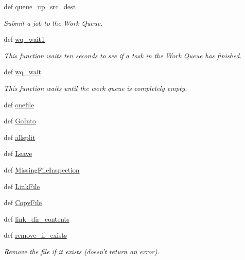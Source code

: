 \begin{DoxyCompactItemize}
def \hyperlink{namespaceforcebalance_1_1nifty_a5d5abeb4a185fde64721d044831e18ee}{queue\-\_\-up\-\_\-src\-\_\-dest}
\begin{DoxyCompactList}\small\item\em \-Submit a job to the \-Work \-Queue. \end{DoxyCompactList}\item 
def \hyperlink{namespaceforcebalance_1_1nifty_a374aac2ef003be02fab49b20ff0a82f0}{wq\-\_\-wait1}
\begin{DoxyCompactList}\small\item\em \-This function waits ten seconds to see if a task in the \-Work \-Queue has finished. \end{DoxyCompactList}\item 
def \hyperlink{namespaceforcebalance_1_1nifty_a576de8c5b6f236280e07e73e39b2ab7c}{wq\-\_\-wait}
\begin{DoxyCompactList}\small\item\em \-This function waits until the work queue is completely empty. \end{DoxyCompactList}\item 
def \hyperlink{namespaceforcebalance_1_1nifty_ab5417ad84c6c760965cd195c6c387914}{onefile}
\item 
def \hyperlink{namespaceforcebalance_1_1nifty_ad432b88307e1178b0690c0d350b1af36}{\-Go\-Into}
\item 
def \hyperlink{namespaceforcebalance_1_1nifty_ac9ab6c5543a2e3080061e0024850edf3}{allsplit}
\item 
def \hyperlink{namespaceforcebalance_1_1nifty_ab04e8690d099db2379dc860e0d040120}{\-Leave}
\item 
def \hyperlink{namespaceforcebalance_1_1nifty_ae87c7def5f8edf2ec30737bdb1d2636f}{\-Missing\-File\-Inspection}
\item 
def \hyperlink{namespaceforcebalance_1_1nifty_ab182a9da2a2f42cf45942fbee6acf9b1}{\-Link\-File}
\item 
def \hyperlink{namespaceforcebalance_1_1nifty_af5f0e1ba7689f1ab40383ba0480560a9}{\-Copy\-File}
\item 
def \hyperlink{namespaceforcebalance_1_1nifty_a0cf4e58f90acf20e3d6224be2354082c}{link\-\_\-dir\-\_\-contents}
\item 
def \hyperlink{namespaceforcebalance_1_1nifty_a25efa4d501ad852a234721af18978f7e}{remove\-\_\-if\-\_\-exists}
\begin{DoxyCompactList}\small\item\em \-Remove the file if it exists (doesn't return an error). \end{DoxyCompactList}\item 

\end{DoxyCompactItemize}
